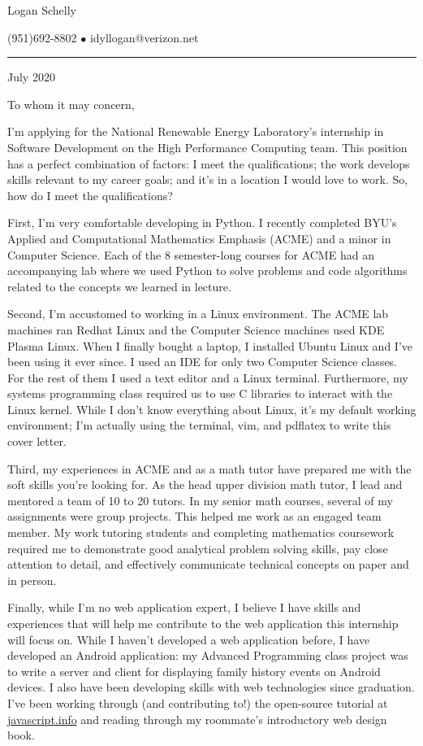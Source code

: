 \documentclass{article}
\begin{document}
\begin{center}
{\Large Logan Schelly}

(951)\phantom{-}692-8802
$\bullet$
idyllogan@verizon.net
\end{center}

\hrule
\bigskip
{} July 2020
\bigskip

To whom it may concern,
\bigskip

I'm applying for the National Renewable Energy Laboratory's internship 
in Software Development on the High Performance Computing team.
This position has a perfect combination of factors:
I meet the qualifications; 
the work develops skills relevant to my career goals;
and it's in a location I would love to work.
So, how do I meet the qualifications?

First, I'm very comfortable developing in Python.
I recently completed BYU's Applied and Computational Mathematics Emphasis (ACME) and a minor in Computer Science.
Each of the 8 semester-long courses for ACME had an accompanying lab where we
used Python to solve problems and code algorithms related to the concepts we learned in lecture.

Second, I'm accustomed to working in a Linux environment.
The ACME lab machines ran Redhat Linux and the Computer Science machines used KDE Plasma Linux.
When I finally bought a laptop, I installed Ubuntu Linux and I've been using it ever since.
I used an IDE for only two Computer Science classes.
For the rest of them I used a text editor and a Linux terminal.
Furthermore, my systems programming class required us to use C libraries to interact with the Linux kernel.
While I don't know everything about Linux, it's my default working environment;
I'm actually using the terminal, vim, and pdflatex to write this cover letter.

Third, my experiences in ACME and as a math tutor have prepared me with the soft skills you're looking for.
As the head upper division math tutor, I lead and mentored a team of 10 to 20 tutors.
In my senior math courses, several of my assignments were group projects.
This helped me work as an engaged team member.
My work tutoring students and completing mathematics coursework required me to
demonstrate good analytical problem solving skills,
pay close attention to detail, and
effectively communicate technical concepts on paper and in person.

Finally, while I'm no web application expert, I believe I have skills and experiences
that will help me contribute to the web application this internship will focus on.
While I haven't developed a web application before, I have developed an Android application:
my Advanced Programming class project was to write a server and client for displaying family history events on Android devices.
I also have been developing skills with web technologies since graduation.
I've been working through (and contributing to!) the open-source tutorial at
\href{https://javascript.info}{javascript.info} and reading through my roommate's introductory web design book.
\end{document}
